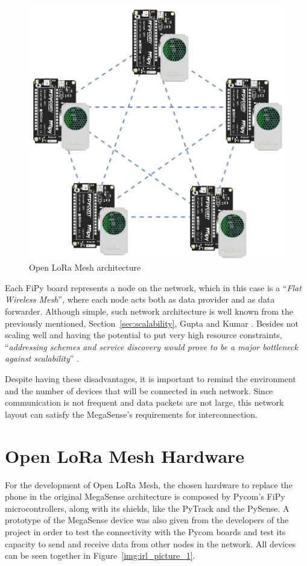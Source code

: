 		\begin{figure}[h]
			\centering
			\includegraphics[width=.7\textwidth]{resources/img/chap5/mesh-architecture-1}
			\caption{Open LoRa Mesh architecture}
			\label{img:openmesh_architecture}
		\end{figure}
		
		Each FiPy board represents a node on the network, which in this case is a ``\textit{Flat Wireless Mesh}'', where each node acts both as data provider and as data forwarder.
		Although simple, such network architecture is well known from the previously mentioned, Section~\ref{sec:scalability}, Gupta and Kumar \cite{825799}.
		Besides not scaling well and having the potential to put very high resource constraints, ``\textit{addressing schemes and service discovery would prove to be a major bottleneck against scalability}'' \cite{92000412}.
		
		Despite having these disadvantages, it is important to remind the environment and the number of devices that will be connected in such network.
		Since communication is not frequent and data packets are not large, this network layout can satisfy the MegaSense's requirements for interconnection.

	\section{Open LoRa Mesh Hardware}\label{sec:hardware_solution}
	
		For the development of Open LoRa Mesh, the chosen hardware to replace the phone in the original MegaSense architecture is composed by Pycom's FiPy microcontrollers, along with its shields, like the PyTrack and the PySense.
		A prototype of the MegaSense device was also given from the developers of the project in order to test the connectivity with the Pycom boards and test its capacity to send and receive data from other nodes in the network.
		All devices can be seen together in Figure~\ref{img:irl_picture_1}.
		
